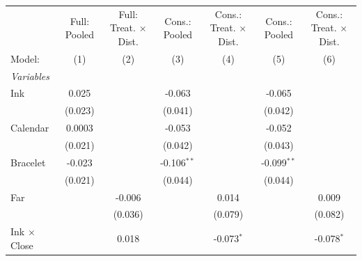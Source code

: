
 
\caption{\label{tab:conservative-table-a-attrition-regression} Knowledge-Table Attrition}
\centering
\begin{tabular}{lcccccc}
   \tabularnewline \midrule \midrule
                                                         & Full: Pooled & Full: Treat. $\times$ Dist.  & Cons.: Pooled & Cons.: Treat. $\times$ Dist.  & Cons.: Pooled & Cons.: Treat. $\times$ Dist. \\    
   Model:                                                & (1)          & (2)                          & (3)           & (4)                           & (5)           & (6)\\  
   \midrule
   \emph{Variables}\\
   Ink                                                   & 0.025        &                              & -0.063        &                               & -0.065        &   \\   
                                                         & (0.023)      &                              & (0.041)       &                               & (0.042)       &   \\   
   Calendar                                              & 0.0003       &                              & -0.053        &                               & -0.052        &   \\   
                                                         & (0.021)      &                              & (0.042)       &                               & (0.043)       &   \\   
   Bracelet                                              & -0.023       &                              & -0.106$^{**}$ &                               & -0.099$^{**}$ &   \\   
                                                         & (0.021)      &                              & (0.044)       &                               & (0.044)       &   \\   
   Far                                                   &              & -0.006                       &               & 0.014                         &               & 0.009\\   
                                                         &              & (0.036)                      &               & (0.079)                       &               & (0.082)\\   
   Ink $\times$ Close                                    &              & 0.018                        &               & -0.073$^{*}$                  &               & -0.078$^{*}$\\   

\end{tabular}
